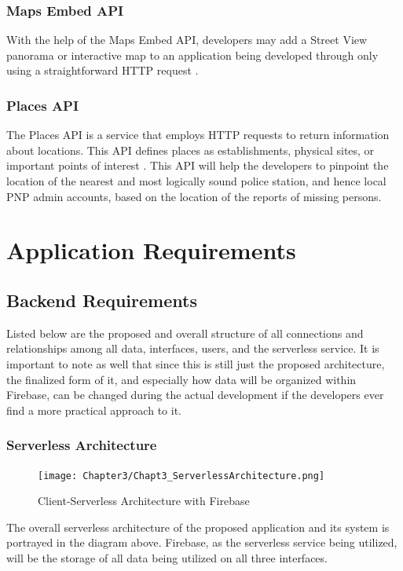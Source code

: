 \subsubsection{Maps Embed API}
With the help of the Maps Embed API, developers may add a Street View panorama or interactive map to an application being developed through only using a straightforward HTTP request \cite{mapsEmbed}.

\subsubsection{Places API}
The Places API is a service that employs HTTP requests to return information about locations. This API defines places as establishments, physical sites, or important points of interest \cite{placesAPI}. This API will help the developers to pinpoint the location of the nearest and most logically sound police station, and hence local PNP admin accounts, based on the location of the reports of missing persons.

\section{Application Requirements}
\subsection{Backend Requirements}
Listed below are the proposed and overall structure of all connections and relationships among all data, interfaces, users, and the serverless service. It is important to note as well that since this is still just the proposed architecture, the finalized form of it, and especially how data will be organized within Firebase, can be changed during the actual development if the developers ever find a more practical approach to it.

\subsubsection{Serverless Architecture}

\begin{figure}[!h]
    \centering
    \texttt{[image: Chapter3/Chapt3\_ServerlessArchitecture.png]}
    \caption{Client-Serverless Architecture with Firebase}
    \label{fig:ServerlessFirebase}
\end{figure}

The overall serverless architecture of the proposed application and its system is portrayed in the diagram above. Firebase, as the serverless service being utilized, will be the storage of all data being utilized on all three interfaces. 

